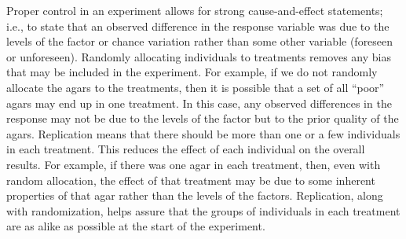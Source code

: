 \documentclass[10pt,openany]{book}\usepackage[]{graphicx}\usepackage[]{color}
\begin{document}
Proper control in an experiment allows for strong cause-and-effect statements; i.e., to state that an observed difference in the response variable was due to the levels of the factor or chance variation rather than some other variable (foreseen or unforeseen).  Randomly allocating individuals to treatments removes any bias that may be included in the experiment.  For example, if we do not randomly allocate the agars to the treatments, then it is possible that a set of all ``poor'' agars may end up in one treatment.  In this case, any observed differences in the response may not be due to the levels of the factor but to the prior quality of the agars.  Replication means that there should be more than one or a few individuals in each treatment.  This reduces the effect of each individual on the overall results.  For example, if there was one agar in each treatment, then, even with random allocation, the effect of that treatment may be due to some inherent properties of that agar rather than the levels of the factors.  Replication, along with randomization, helps assure that the groups of individuals in each treatment are as alike as possible at the start of the experiment.

\end{document}
